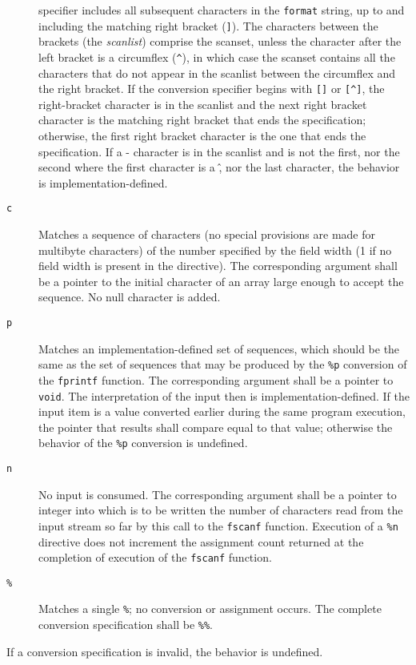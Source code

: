 \begin{description}
specifier includes all subsequent characters in the \texttt{format} string, up
to and including the matching right bracket (\texttt{]}). The characters
between the brackets (the \emph{scanlist}) comprise the scanset, unless the
character after the left bracket is a circumflex (\texttt{\^{}}), in which case
the scanset contains all the characters that do not appear in the scanlist
between the circumflex and the right bracket. If the conversion specifier
begins with \texttt{[]} or \texttt{[\^{}]}, the right-bracket character is in
the scanlist and the next right bracket character is the matching right bracket
that ends the specification; otherwise, the first right bracket character is
the one that ends the specification. If a - character is in the scanlist and is
not the first, nor the second where the first character is a \^, nor the last
character, the behavior is implementation-defined.
	\item[\texttt{c}] Matches a sequence of characters (no special provisions
are made for multibyte characters) of the number specified by the field width
(1 if no field width is present in the directive). The corresponding argument
shall be a pointer to the initial character of an array large enough to accept
the sequence. No null character is added.
	\item[\texttt{p}] Matches an implementation-defined set of sequences, which
should be the same as the set of sequences that may be produced by the
\texttt{\%p} conversion of the \texttt{fprintf} function. The corresponding
argument shall be a pointer to \texttt{void}. The interpretation of the input
then is implementation-defined. If the input item is a value converted earlier
during the same program execution, the pointer that results shall compare equal
to that value; otherwise the behavior of the \texttt{\%p} conversion is
undefined.
	\item[\texttt{n}] No input is consumed. The corresponding argument shall be
a pointer to integer into which is to be written the number of characters read
from the input stream so far by this call to the \texttt{fscanf} function.
Execution of a \texttt{\%n} directive does not increment the assignment count
returned at the completion of execution of the \texttt{fscanf} function.
	\item[\texttt{\%}] Matches a single \texttt{\%}; no conversion or
assignment occurs. The complete conversion specification shall be
\texttt{\%\%}.
\end{description}

If a conversion specification is invalid, the behavior is undefined.


